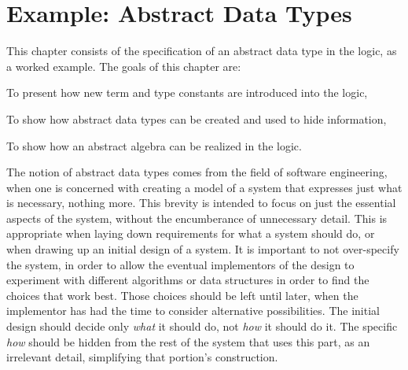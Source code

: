 
\chapter{Example: Abstract Data Types}\label{chap:adt}

%
This chapter consists of the specification of an abstract data type
in the \HOLW{} logic, as a worked example.
The goals of this chapter are:

\begin{myenumerate}
\item To present how new term and type constants are introduced into the logic,
\item To show how abstract data types can be created and used to hide
      information,
\item To show how an abstract algebra can be realized in the \HOLW{} logic.
\end{myenumerate}

The notion of abstract data types comes from the field of software
engineering, when one is concerned with creating a model of a system
that expresses just what is necessary, nothing more.
This brevity is intended to focus on just the essential aspects
of the system, without the encumberance of unnecessary detail.  This is
appropriate when laying down requirements for what a system should do,
or when drawing up an initial design of a system.
It is important to not over-specify
the system, in order to allow the eventual implementors of the design
to experiment with different algorithms or data structures in order to find
the choices that work best.  Those choices should be left until later, when the
implementor has had the time to consider alternative possibilities. The
initial design should decide
only {\it what\/} it should do, not {\it how\/} it should do it.
The specific {\it how\/} should be hidden from the rest of the system
that uses this part, as an irrelevant detail,
simplifying that portion's construction.

